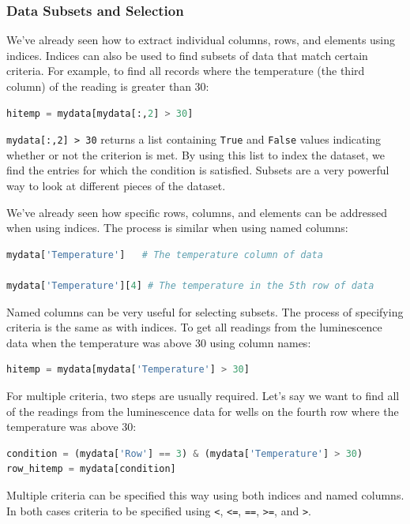 \subsubsection{Data Subsets and Selection}

We've already seen how to extract individual columns, rows, and elements
using indices. Indices can also be used to find subsets of data that
match certain criteria. For example, to find all records where the
temperature (the third column) of the reading is greater than 30:

\begin{lstlisting}[language=Python]
hitemp = mydata[mydata[:,2] > 30]
\end{lstlisting}
\lstinline!mydata[:,2] > 30! returns a list containing \lstinline!True!
and \lstinline!False! values indicating whether or not the criterion is
met. By using this list to index the dataset, we find the entries for
which the condition is satisfied. Subsets are a very powerful way to
look at different pieces of the dataset.

We've already seen how specific rows, columns, and elements can be
addressed when using indices. The process is similar when using named
columns:

\begin{lstlisting}[language=Python]
mydata['Temperature']   # The temperature column of data

mydata['Temperature'][4] # The temperature in the 5th row of data
\end{lstlisting}
Named columns can be very useful for selecting subsets. The process of
specifying criteria is the same as with indices. To get all readings
from the luminescence data when the temperature was above 30 using
column names:

\begin{lstlisting}[language=Python]
hitemp = mydata[mydata['Temperature'] > 30]
\end{lstlisting}
For multiple criteria, two steps are usually required. Let's say we want
to find all of the readings from the luminescence data for wells on the
fourth row where the temperature was above 30:

\begin{lstlisting}[language=Python]
condition = (mydata['Row'] == 3) & (mydata['Temperature'] > 30)
row_hitemp = mydata[condition]
\end{lstlisting}
Multiple criteria can be specified this way using both indices and named
columns. In both cases criteria to be specified using \lstinline!<!,
\lstinline!<=!, \lstinline!==!, \lstinline!>=!, and \lstinline!>!.

